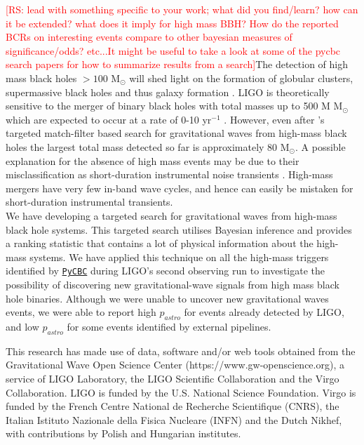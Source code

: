 \documentclass[%
preprint,
 amsmath,amssymb,
 aps,
]{revtex4}
\newcommand{\pycbc}{{\sc \href{https://pycbc.org/}{\texttt{PyCBC}}}\xspace}
\newcommand{\msun}{{\sc M${}_\odot$}\xspace}
\newcommand{\rs}[1]{\textcolor{red}{[RS: #1]}}
\begin{document}
\rs{lead with something specific to your work; what did you find/learn? how can it be extended? what does it imply for high mass BBH? How do the reported BCRs on interesting events compare to other bayesian measures of significance/odds? etc...It might be useful to take a look at some of the pycbc search papers for how to summarize results from a search}The detection of high mass black holes $>100$ \msun will shed light on the formation of globular clusters, supermassive black holes and thus galaxy formation \citep{lodato2006supermassive, 2018IMBHreview}. LIGO is theoretically sensitive to the merger of binary black holes with total masses up to 500 M \msun which are expected to occur at a rate of 0-10 yr\(^{-1}\) \cite{mandel2008rates, fregeau2006imbhbRatePrediction}. However, even after \citet{ligo_imbh_search}'s targeted match-filter based search for gravitational waves from high-mass black holes the largest total mass detected so far is approximately 80 \msun \citep{abbott2019gwtc}. A possible explanation for the absence of high mass events may be due to their misclassification as short-duration instrumental noise transients \citep{blipGlitches}. High-mass mergers have very few in-band wave cycles, and hence can easily be mistaken for short-duration instrumental transients. \\

We have developing a targeted search for gravitational waves from high-mass black hole systems. This targeted search utilises Bayesian inference and provides a ranking statistic that contains a lot of physical information about the high-mass systems. We have applied this technique on all the high-mass triggers identified by \pycbc during LIGO's second observing run to investigate the possibility of discovering new gravitational-wave signals from high mass black hole binaries. Although we were unable to uncover new gravitational waves events, we were able to report high $p_{astro}$ for events already detected by LIGO, and low $p_{astro}$ for some events identified by external pipelines. 

\begin{acknowledgments}

This research has made use of data, software and/or web tools obtained from the Gravitational Wave Open Science Center (https://www.gw-openscience.org), a service of LIGO Laboratory, the LIGO Scientific Collaboration and the Virgo Collaboration. LIGO is funded by the U.S. National Science Foundation. Virgo is funded by the French Centre National de Recherche Scientifique (CNRS), the Italian Istituto Nazionale della Fisica Nucleare (INFN) and the Dutch Nikhef, with contributions by Polish and Hungarian institutes.

\end{acknowledgments}





\end{document}
